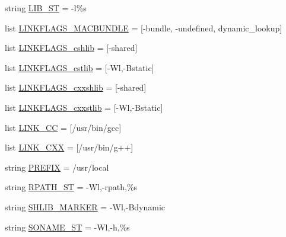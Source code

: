 \begin{DoxyCompactItemize}
string \hyperlink{namespace__cache_a244157e2aa1a7c25c1506ad22c2481d8}{L\+I\+B\+\_\+\+ST} = \textquotesingle{}-\/l\%s\textquotesingle{}
\item 
list \hyperlink{namespace__cache_a546385bc9106f47044313b26ba61cca5}{L\+I\+N\+K\+F\+L\+A\+G\+S\+\_\+\+M\+A\+C\+B\+U\+N\+D\+LE} = \mbox{[}\textquotesingle{}-\/bundle\textquotesingle{}, \textquotesingle{}-\/undefined\textquotesingle{}, \textquotesingle{}dynamic\+\_\+lookup\textquotesingle{}\mbox{]}
\item 
list \hyperlink{namespace__cache_abc97c04460afa6ce6aac9f7422d3ec78}{L\+I\+N\+K\+F\+L\+A\+G\+S\+\_\+cshlib} = \mbox{[}\textquotesingle{}-\/shared\textquotesingle{}\mbox{]}
\item 
list \hyperlink{namespace__cache_a08c7c52817f869e86e22b3fcf7282674}{L\+I\+N\+K\+F\+L\+A\+G\+S\+\_\+cstlib} = \mbox{[}\textquotesingle{}-\/Wl,-\/Bstatic\textquotesingle{}\mbox{]}
\item 
list \hyperlink{namespace__cache_a459b88ce5051632017031db72c57a017}{L\+I\+N\+K\+F\+L\+A\+G\+S\+\_\+cxxshlib} = \mbox{[}\textquotesingle{}-\/shared\textquotesingle{}\mbox{]}
\item 
list \hyperlink{namespace__cache_af1aa8e93aa46f56762335c75c4050171}{L\+I\+N\+K\+F\+L\+A\+G\+S\+\_\+cxxstlib} = \mbox{[}\textquotesingle{}-\/Wl,-\/Bstatic\textquotesingle{}\mbox{]}
\item 
list \hyperlink{namespace__cache_a17ade12a67fac84c12523ac6a5a8da2c}{L\+I\+N\+K\+\_\+\+CC} = \mbox{[}\textquotesingle{}/usr/bin/gcc\textquotesingle{}\mbox{]}
\item 
list \hyperlink{namespace__cache_a4dc09ee75cc43aa5a415387c830ebe14}{L\+I\+N\+K\+\_\+\+C\+XX} = \mbox{[}\textquotesingle{}/usr/bin/g++\textquotesingle{}\mbox{]}
\item 
string \hyperlink{namespace__cache_a6cd5b5888f460a65e8531f55dbe093a9}{P\+R\+E\+F\+IX} = \textquotesingle{}/usr/local\textquotesingle{}
\item 
string \hyperlink{namespace__cache_aed3d2462e12bacd1cb2942799f0e5a67}{R\+P\+A\+T\+H\+\_\+\+ST} = \textquotesingle{}-\/Wl,-\/rpath,\%s\textquotesingle{}
\item 
string \hyperlink{namespace__cache_a21c283512025e24859931c6d50fa2ffb}{S\+H\+L\+I\+B\+\_\+\+M\+A\+R\+K\+ER} = \textquotesingle{}-\/Wl,-\/Bdynamic\textquotesingle{}
\item 
string \hyperlink{namespace__cache_a631d41d9aa1c4ae744a4042f66d9cff4}{S\+O\+N\+A\+M\+E\+\_\+\+ST} = \textquotesingle{}-\/Wl,-\/h,\%s\textquotesingle{}
\item 

\end{DoxyCompactItemize}
